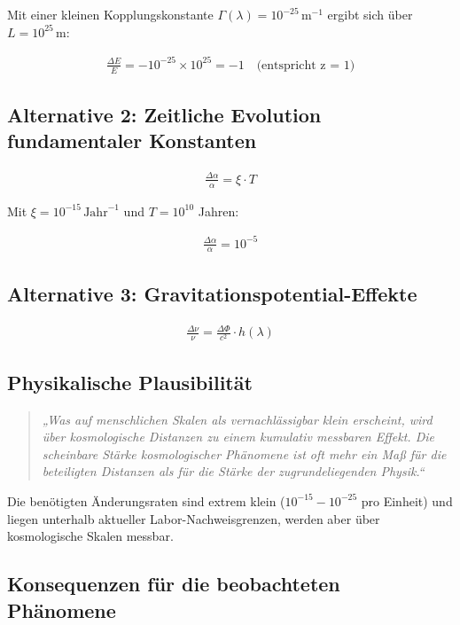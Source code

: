 \documentclass{article}
\begin{document}
	Mit einer kleinen Kopplungskonstante $\Gamma(\lambda) = 10^{-25} \, \text{m}^{-1}$ ergibt sich über $L = 10^{25} \, \text{m}$:
	
	\begin{align}
		\frac{\Delta E}{E} = -10^{-25} \times 10^{25} = -1 \quad \text{(entspricht z = 1)}
	\end{align}
	
	\subsection{Alternative 2: Zeitliche Evolution fundamentaler Konstanten}
	
	\begin{align}
		\frac{\Delta\alpha}{\alpha} = \xi \cdot T
	\end{align}
	
	Mit $\xi = 10^{-15} \, \text{Jahr}^{-1}$ und $T = 10^{10}$ Jahren:
	
	\begin{align}
		\frac{\Delta\alpha}{\alpha} = 10^{-5}
	\end{align}
	
	\subsection{Alternative 3: Gravitationspotential-Effekte}
	
	\begin{align}
		\frac{\Delta\nu}{\nu} = \frac{\Delta\Phi}{c^2} \cdot h(\lambda)
	\end{align}
	
	\subsection{Physikalische Plausibilität}
	
	\begin{quote}
		\textit{„Was auf menschlichen Skalen als vernachlässigbar klein erscheint, wird über kosmologische Distanzen zu einem kumulativ messbaren Effekt. Die scheinbare Stärke kosmologischer Phänomene ist oft mehr ein Maß für die beteiligten Distanzen als für die Stärke der zugrundeliegenden Physik.“}
	\end{quote}
	
	Die benötigten Änderungsraten sind extrem klein ($10^{-15} - 10^{-25}$ pro Einheit) und liegen unterhalb aktueller Labor-Nachweisgrenzen, werden aber über kosmologische Skalen messbar.
	
	\subsection{Konsequenzen für die beobachteten Phänomene}
	
\end{document}
